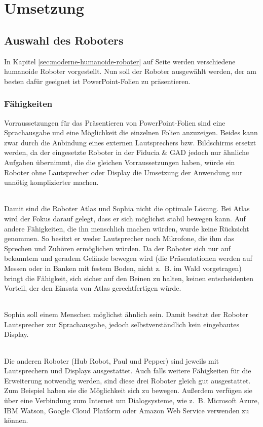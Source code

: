 \chapter{Umsetzung}\label{sec:umsetzung}
\section{Auswahl des Roboters}
In Kapitel \ref{sec:moderne-humanoide-roboter} auf Seite
\pageref{sec:moderne-humanoide-roboter} werden verschiedene humanoide Roboter
vorgestellt. Nun soll der Roboter ausgewählt werden, der am besten dafür
geeignet ist PowerPoint-Folien zu präsentieren.

\subsection{Fähigkeiten}
Vorraussetzungen für das Präsentieren von PowerPoint-Folien sind eine
Sprachausgabe und eine Möglichkeit die einzelnen Folien anzuzeigen. Beides kann
zwar durch die Anbindung eines externen Lautsprechers bzw. Bildschirms ersetzt
werden, da der eingesetzte Roboter in der Fiducia \& GAD jedoch nur ähnliche
Aufgaben übernimmt, die die gleichen Vorraussetzungen haben, würde ein Roboter
ohne Lautsprecher oder Display die Umsetzung der Anwendung nur unnötig
komplizierter machen.

\subparagraph{}
Damit sind die Roboter Atlas und Sophia nicht die optimale Lösung. Bei Atlas
wird der Fokus darauf gelegt, dass er sich möglichst stabil bewegen kann. Auf
andere Fähigkeiten, die ihn menschlich machen würden, wurde keine Rücksicht
genommen. So besitzt er weder Lautsprecher noch Mikrofone, die ihm das Sprechen
und Zuhören ermöglichen würden. Da der Roboter sich nur auf bekanntem und
geradem Gelände bewegen wird (die Präsentationen werden auf Messen oder in
Banken mit festem Boden, nicht z.~B. im Wald vorgetragen) bringt die Fähigkeit,
sich sicher auf den Beinen zu halten, keinen entscheidenten Vorteil, der den
Einsatz von Atlas gerechtfertigen würde.

\subparagraph{}
Sophia soll einem Menschen möglichst ähnlich sein. Damit besitzt der Roboter
Lautsprecher zur Sprachausgabe, jedoch selbstverständlich kein eingebautes
Display.

\subparagraph{}
Die anderen Roboter (Hub Robot, Paul und Pepper) sind jeweils mit Lautsprechern
und Displays ausgestattet. Auch falls weitere Fähigkeiten für die Erweiterung
notwendig werden, sind diese drei Roboter gleich gut ausgestattet. Zum Beispiel
haben sie die Möglichkeit sich zu bewegen. Außerdem verfügen sie über eine
Verbindung zum Internet um Dialogsysteme, wie z.~B. Microsoft Azure, IBM Watson,
Google Cloud Platform oder Amazon Web Service verwenden zu können.

